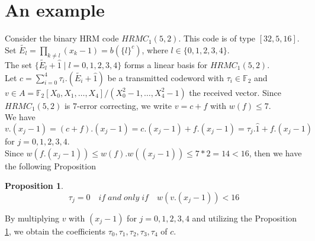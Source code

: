 \documentclass{article}
\theoremstyle{plain}
\newtheorem{prop}[thm]{Proposition}
\theoremstyle{definition}
\begin{document}
\section{An example}
Consider the binary HRM code $HRMC_{1}(5,2)$. This code is of type $\left[32,5,16\right]$.\\
Set $\widetilde{E_{l}}=\prod_{k\neq l}(x_{k}-1)=b(\{l\}^c)$, where $l\in \{0,1,2,3,4\}$.\\
The set $\{\widetilde{E_{l}}+\hat{1}\mid l=0,1,2,3,4\}$ forms a linear basis for $HRMC_{1}(5,2)$.\\
Let $c=\sum_{i=0}^{4}\tau_{i}.(\widetilde{E_{i}}+\hat{1})$ be a transmitted codeword with $\tau_{i}\in\mathbb{F}_{2}$ and $v\in A=\mathbb{F}_{2}[X_{0},X_{1},\ldots ,X_{4}]/(X_{0}^{2}-1,\ldots ,X_{4}^{2}-1)$ the received vector. Since $HRMC_{1}(5,2)$ is $7$-error correcting, we write $v=c+f$ with $w(f)\leq 7$.\\
We have\\
$v.(x_j-1)=(c+f).(x_j-1)=c.(x_j-1)+f.(x_j-1)=\tau_j.\hat{1}+f.(x_j-1)$ for $j=0,1,2,3,4$.\\
Since $w(f.(x_j-1))\leq w(f).w((x_j-1))\leq 7*2=14<16$, then we have the following Proposition
\begin{prop}\label{coeftest}
\begin{equation*}
\tau_j=0 \quad if \;and\; only\; if \quad w(v.(x_j-1))<16
\end{equation*}
\end{prop}
By multiplying $v$ with $(x_j-1)$ for $j=0,1,2,3,4$ and utilizing the Proposition \ref{coeftest}, we obtain the coefficients $\tau_0,\tau_1,\tau_2,\tau_3,\tau_4$ of $c$.
\end{document}
